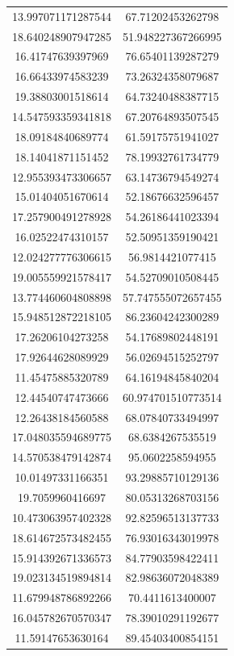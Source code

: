 \begin{table}
\begin{tabular}{cc}
13.997071171287544 & 67.71202453262798 \\
18.640248907947285 & 51.948227367266995 \\
16.41747639397969 & 76.65401139287279 \\
16.66433974583239 & 73.26324358079687 \\
19.38803001518614 & 64.73240488387715 \\
14.547593359341818 & 67.20764893507545 \\
18.09184840689774 & 61.59175751941027 \\
18.14041871151452 & 78.19932761734779 \\
12.955393473306657 & 63.14736794549274 \\
15.01404051670614 & 52.18676632596457 \\
17.257900491278928 & 54.26186441023394 \\
16.02522474310157 & 52.50951359190421 \\
12.024277776306615 & 56.9814421077415 \\
19.005559921578417 & 54.52709010508445 \\
13.774460604808898 & 57.747555072657455 \\
15.948512872218105 & 86.23604242300289 \\
17.26206104273258 & 54.17689802448191 \\
17.92644628089929 & 56.02694515252797 \\
11.45475885320789 & 64.16194845840204 \\
12.44540747473666 & 60.974701510773514 \\
12.26438184560588 & 68.07840733494997 \\
17.048035594689775 & 68.6384267535519 \\
14.570538479142874 & 95.0602258594955 \\
10.01497331166351 & 93.29885710129136 \\
19.7059960416697 & 80.05313268703156 \\
10.473063957402328 & 92.82596513137733 \\
18.614672573482455 & 76.93016343019978 \\
15.914392671336573 & 84.77903598422411 \\
19.023134519894814 & 82.98636072048389 \\
11.679948786892266 & 70.4411613400007 \\
16.045782670570347 & 78.39010291192677 \\
11.59147653630164 & 89.45403400854151 \\

\end{tabular}
\end{table}
